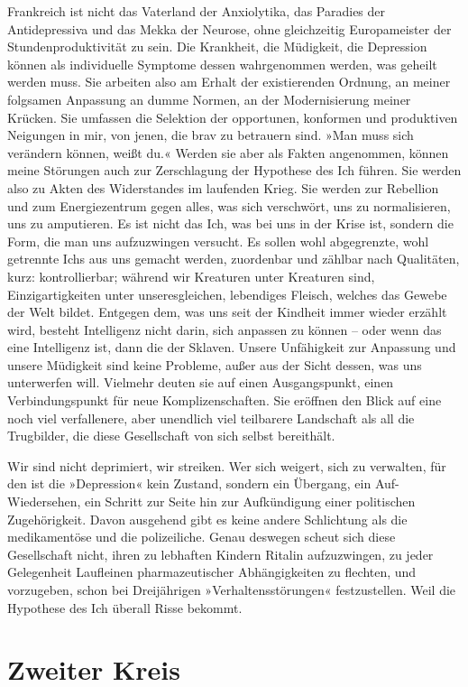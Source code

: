 Frankreich ist nicht das Vaterland der Anxiolytika, das Paradies
der Antidepressiva und das Mekka der Neurose, ohne gleichzeitig
Europameister der Stundenproduktivität zu sein. Die Krankheit, die
Müdigkeit, die Depression können als individuelle Symptome dessen
wahrgenommen werden, was geheilt werden muss. Sie arbeiten also am
Erhalt der existierenden Ordnung, an meiner folgsamen Anpassung an
dumme Normen, an der Modernisierung meiner Krücken. Sie umfassen
die Selektion der opportunen, konformen und produktiven Neigungen
in mir, von jenen, die brav zu betrauern sind. »Man muss sich
verändern können, weißt du.« Werden sie aber als Fakten angenommen,
können meine Störungen auch zur Zerschlagung der Hypothese des Ich
führen. Sie werden also zu Akten des Widerstandes im laufenden
Krieg. Sie werden zur Rebellion und zum Energiezentrum gegen alles,
was sich verschwört, uns zu normalisieren, uns zu amputieren. Es
ist nicht das Ich, was bei uns in der Krise ist, sondern die Form,
die man uns aufzuzwingen versucht. Es sollen wohl abgegrenzte, wohl
getrennte Ichs aus uns gemacht werden, zuordenbar und zählbar nach
Qualitäten, kurz: kontrollierbar; während wir Kreaturen unter
Kreaturen sind, Einzigartigkeiten unter unseresgleichen, lebendiges
Fleisch, welches das Gewebe der Welt bildet. Entgegen dem, was uns
seit der Kindheit immer wieder erzählt wird, besteht Intelligenz
nicht darin, sich anpassen zu können – oder wenn das eine
Intelligenz ist, dann die der Sklaven. Unsere Unfähigkeit zur
Anpassung und unsere Müdigkeit sind keine Probleme, außer aus der
Sicht dessen, was uns unterwerfen will. Vielmehr deuten sie auf
einen Ausgangspunkt, einen Verbindungspunkt für neue
Komplizenschaften. Sie eröffnen den Blick auf eine noch viel
verfallenere, aber unendlich viel teilbarere Landschaft als all die
Trugbilder, die diese Gesellschaft von sich selbst bereithält.

Wir sind nicht deprimiert, wir streiken. Wer sich weigert, sich zu
verwalten, für den ist die »Depression« kein Zustand, sondern ein
Übergang, ein Auf-Wiedersehen, ein Schritt zur Seite hin zur
Aufkündigung einer politischen Zugehörigkeit. Davon ausgehend gibt
es keine andere Schlichtung als die medikamentöse und die
polizeiliche. Genau deswegen scheut sich diese Gesellschaft nicht,
ihren zu lebhaften Kindern Ritalin aufzuzwingen, zu jeder
Gelegenheit Laufleinen pharmazeutischer Abhängigkeiten zu flechten,
und vorzugeben, schon bei Dreijährigen »Verhaltensstörungen«
festzustellen. Weil die Hypothese des Ich überall Risse bekommt.

\section{Zweiter Kreis}

